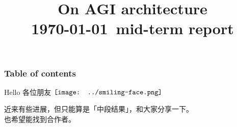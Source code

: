 \documentclass[15pt]{beamer}
\title[On AGI architecture]{\cc{\Huge《论 AGI 的架构》\\{\footnotesize \today 中期报告}}
	{On AGI architecture \\{\footnotesize \today \ mid-term report}}}
\author{\cc{YKY 甄景贤}{YKY}} %
\institute[] %
{
Independent researcher, Hong Kong \\ %
\medskip
\textit{generic.intelligence@gmail.com} %
}
\date{} %
\makeatletter
\newcommand{\cc}[2]{#1}
\newcommand{\cc}[2]{#2}
\renewcommand{\smiley}{$\vcenter{\hbox{\texttt{[image: ../smiling-face.png]}}}$}
\newif\ifframeinlbf
\newcommand\listofframes{\@starttoc{lbf}}
\makeatother
\begin{document}
\frameinlbffalse
\frame{\titlepage}

\begin{frame}
\frametitle{Table of contents}
\listofframes
\vspace*{0.5cm}
\cc{
Hello 各位朋友 \smiley

近来有些进展，但只能算是「中段结果」，和大家分享一下。 \\
也希望能找到合作者。
}{
Hello friends \smiley

I have made some intermediate progress recently, which I share below, \\
and also hope to find collaborators.
}
\end{frame}

%
%



\end{document}
